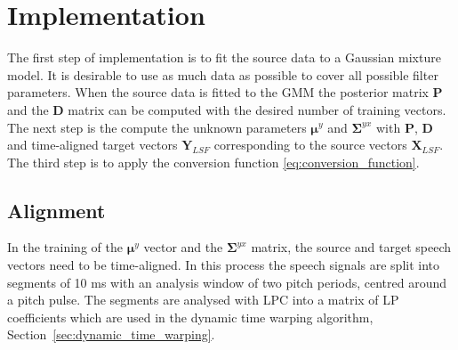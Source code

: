\chapter{Implementation} %
\label{cha:implementation}
The first step of implementation is to fit the source data to a Gaussian mixture model. It is desirable to use as much data as possible to cover all possible filter parameters. When the source data is fitted to the GMM the posterior matrix $\mathbf{P}$ and the $\mathbf{D}$ matrix can be computed with the desired number of training vectors. The next step is the compute the unknown parameters $\boldsymbol{\mu}^y$ and $\mathbf{\Sigma}^{yx}$ with $\mathbf{P}$, $\mathbf{D}$ and time-aligned target vectors $\mathbf{Y}_{LSF}$ corresponding to the source vectors $\mathbf{X}_{LSF}$. The third step is to apply the conversion function \eqref{eq:conversion_function}.


\section{Alignment} %
\label{sec:alignment}
In the training of the $\boldsymbol{\mu}^y$ vector and the $\mathbf{\Sigma}^{yx}$ matrix, the source and target speech vectors need to be time-aligned. In this process the speech signals are split into segments of 10 ms with an analysis window of two pitch periods, centred around a pitch pulse. The segments are analysed with LPC into a matrix of LP coefficients which are used in the dynamic time warping algorithm, Section~\ref{sec:dynamic_time_warping}.

